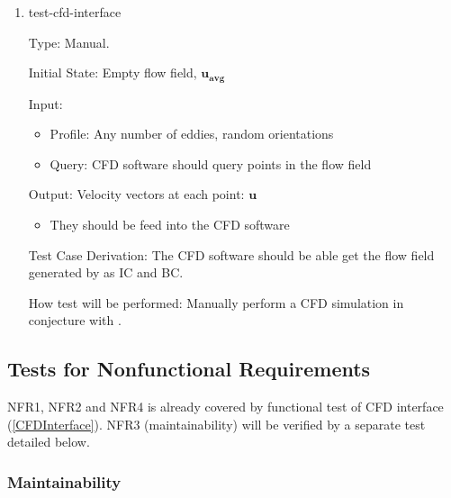 \documentclass[12pt, titlepage]{article}
\begin{document}
\begin{enumerate}

  \item{test-cfd-interface\\}
  
  Type: Manual.
            
  Initial State: Empty flow field, $\mathbf{u_{avg}}$
            
  Input:
  \begin{itemize}
    \item Profile: Any number of eddies, random orientations
    \item Query: CFD software should query points in the flow field
  \end{itemize}
  Output: Velocity vectors at each point: $\mathbf{u}$
  \begin{itemize}
    \item They should be feed into the CFD software
  \end{itemize}

  Test Case Derivation: The CFD software should be able get the flow field generated by \progname{} as IC and BC.

  How test will be performed: Manually perform a CFD simulation in conjecture with  \progname{}.
\end{enumerate}

\newpage
\subsection{Tests for Nonfunctional Requirements} \label{NonfuncTest}
NFR1, NFR2 and NFR4 is already covered by functional test of CFD interface (\ref{CFDInterface}). NFR3 (maintainability) will be verified by a separate test detailed below.



\subsubsection{Maintainability} \label{MaintTest}
		
\end{document}
